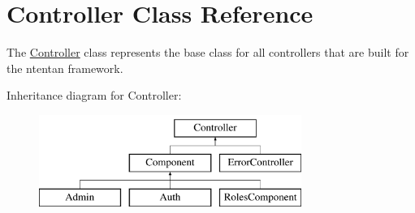 \hypertarget{class_controller}{
\section{Controller Class Reference}
\label{class_controller}
}


The \hyperlink{class_controller}{Controller} class represents the base class for all controllers that are built for the ntentan framework.  


Inheritance diagram for Controller:\begin{figure}[H]
\begin{center}
\leavevmode
\includegraphics[height=3.000000cm]{class_controller}
\end{center}
\end{figure}
